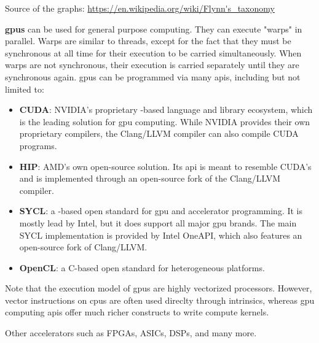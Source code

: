 \documentclass[main]{subfiles}
\begin{document}
{\footnotesize Source of the graphs:
\url{https://en.wikipedia.org/wiki/Flynn's_taxonomy}}

\textbf{\glspl{gpu}} can be used for general purpose
computing. They can execute "warps" in parallel. Warps are similar to threads,
except for the fact that they must be synchronous at all time for their
execution to be carried simultaneously. When warps are not synchronous,
their execution is carried separately until they are synchronous again.
\glspl{gpu} can be programmed via many \glspl{api},
including but not limited to:

\begin{itemize}
\item
\textbf{CUDA}: NVIDIA's proprietary \cpp-based language and library
ecosystem, which is the leading solution for \gls{gpu} computing.
While NVIDIA provides their own proprietary compilers, the Clang/LLVM
compiler can also compile CUDA programs.

\item
\textbf{HIP}: AMD's own open-source solution. Its \gls{api} is meant to
resemble CUDA's and is implemented through an open-source fork of the
Clang/LLVM compiler.

\item
\textbf{SYCL}: a \cpp-based open standard for \gls{gpu} and
accelerator programming. It is mostly lead by Intel, but it does support
all major \gls{gpu} brands. The main SYCL implementation is provided by
Intel OneAPI, which also features an open-source fork of Clang/LLVM.

\item
\textbf{OpenCL}: a C-based open standard for heterogeneous platforms.

\end{itemize}
Note that the execution model of \glspl{gpu} are highly vectorized processors.
However, vector instructions on \glspl{cpu} are often used direclty through
intrinsics, whereas \gls{gpu} computing \glspl{api} offer much richer constructs
to write compute kernels.

Other accelerators such as FPGAs, ASICs, DSPs, and many more.
\end{document}
